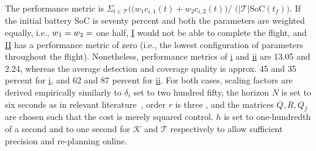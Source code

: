 \documentclass[letterpaper,10pt,conference,twoside]{IEEEtran}
\theoremstyle{definition}
\begin{document}
{\color{black}
The performance metric is $\Sigma_{t\in\mathcal{T}}(${\small $(w_1c_{i,1}(t)+w_2c_{i,2}(t)$}$)/$ $(${\small $|\mathcal{T}|\text{SoC}(t_f)$}$)$. If the initial battery SoC %
is seventy percent and both the parameters are weighted equally, i.e., ${\small w_1=w_2=}$ one half, \hyperref[fig:trajs-I-static]{I} would not be able to complete the flight, and \hyperref[fig:trajs-II-static]{II} has a performance metric of zero (i.e., the lowest configuration of parameters throughout the flight).
Nonetheless, performance metrics of \hyperref[fig:trajs-dyn-i]{i} and \hyperref[fig:trajs-dyn-ii]{ii} are 13.05 and 2.24, whereas the average detection and coverage quality is approx. 45 and 35 percent for \hyperref[fig:trajs-dyn-i]{i}, and 62 and 87 percent for \hyperref[fig:trajs-dyn-ii]{ii}.}
For both cases, scaling factors are derived empirically %
{\color{black}similarly to $\delta_i$ set to two hundred fifty}, 
the horizon $N$ is set to six seconds {\color{black} as in} relevant literature~\cite{gavilan2015iterative,%
stastny2018nonlinear%
}, order $r$ is three%
, and the matrices $Q,R,Q_f$ are chosen such that the cost is merely 
squared control. {\color{black} $h$ is set to one-hundredth of a second and to one second for $\mathcal{K}$ and $\mathcal{T}$ respectively to allow sufficient precision and re-planning online.}
\end{document}
